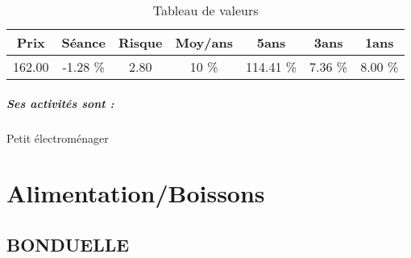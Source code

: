 \documentclass[11pt,a4paper]{report}%
\begin{document}
\begin{table}[H]
  \centering
    \begin{tabular}{|c|c|c|c|c|c|c|}
    \hline
    Prix & Séance & Risque  & Moy/ans & 5ans & 3ans & 1ans \\
    \hline
    162.00 &    -1.28 \%    & 2.80 & 10 \% & 114.41 \% & 7.36 \% & 8.00 \% \\
    \hline
    \end{tabular}%
        \label{tab:table_SEB}%
      \caption{Tableau de valeurs}
\end{table}%

\paragraph{Ses activités sont : } Petit électroménager 
    
    \newpage\chapter{Alimentation/Boissons}


\section{BONDUELLE}
\end{document}

